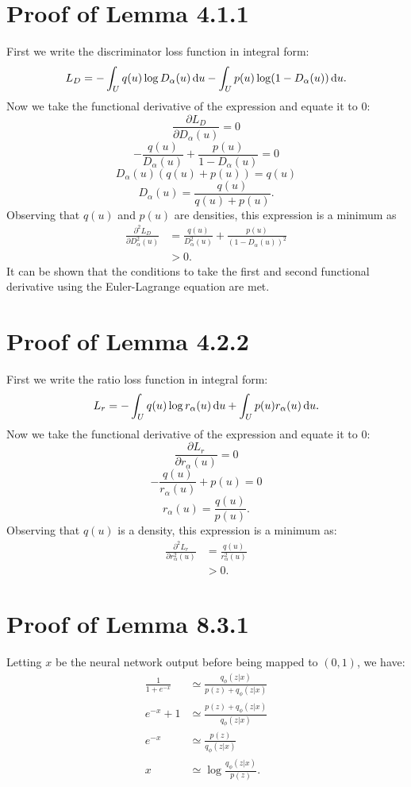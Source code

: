 \documentclass[honours,12pt, twoside]{unswthesis}
\numberwithin{equation}{section}
\theoremstyle{definition}
\begin{document}
\section{Proof of Lemma 4.1.1}\label{app:A.3}
First we write the discriminator loss function in integral form:
\[L_D=-\int_U q(u)\log D_\alpha(u)\, {\rm d}u-\int_U p(u)\log(1-D_\alpha(u))\, {\rm d}u.\]
Now we take the functional derivative of the expression and equate it to $0$:
\[\frac{\partial L_D}{\partial D_\alpha(u)}=0\]
\[-\frac{q(u)}{D_\alpha(u)}+\frac{p(u)}{1-D_\alpha(u)}=0\]
\[D_\alpha(u)(q(u)+p(u))=q(u)\]
\[D_\alpha(u)=\frac{q(u)}{q(u)+p(u)}.\]
Observing that $q(u)$ and $p(u)$ are densities, this expression is a minimum as
\begin{align*}
\frac{\partial^2L_D}{\partial D^2_\alpha(u)}&=\frac{q(u)}{D^2_\alpha(u)}+\frac{p(u)}{(1-D_\alpha(u))^2}\\
&>0.
\end{align*}
It can be shown that the conditions to take the first and second functional derivative using the Euler-Lagrange equation are met.
\section{Proof of Lemma 4.2.2}\label{app:A.4}
First we write the ratio loss function in integral form:
\[L_r=-\int_U q(u)\log r_\alpha(u)\, {\rm d}u+\int_U p(u)r_\alpha(u)\, {\rm d}u.\]
Now we take the functional derivative of the expression and equate it to 0:
\[\frac{\partial L_r}{\partial r_\alpha(u)}=0\]
\[-\frac{q(u)}{r_\alpha (u)}+p(u)=0\]
\[r_\alpha(u)=\frac{q(u)}{p(u)}.\]
Observing that $q(u)$ is a density, this expression is a minimum as:
\begin{align*}
\frac{\partial^2L_r}{\partial r_\alpha^2(u)}&=\frac{q(u)}{r_\alpha^2(u)}\\
&>0.
\end{align*}
\section{Proof of Lemma 8.3.1}\label{app:A.5}
Letting $x$ be the neural network output before being mapped to $(0,1)$, we have:
\begin{align*}
\frac{1}{1+e^{-x}}&\simeq\frac{q_\phi(z|x)}{p(z)+q_\phi(z|x)}\\
e^{-x}+1&\simeq\frac{p(z)+q_\phi(z|x)}{q_\phi(z|x)}\\
e^{-x}&\simeq\frac{p(z)}{q_\phi(z|x)}\\
x&\simeq\log \frac{q_\phi(z|x)}{p(z)}.
\end{align*}
\end{document}
